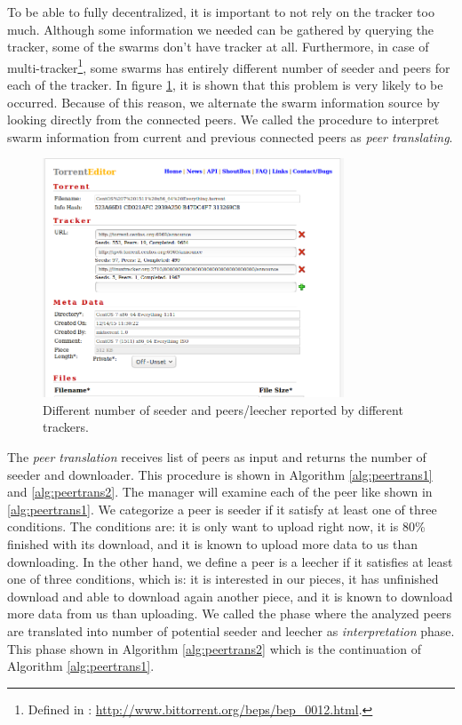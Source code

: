 To be able to fully decentralized, it is important to not rely on the tracker too much. Although some information we needed can be gathered by querying the tracker, some of the swarms don't have tracker at all. Furthermore, in case of multi-tracker\footnote{Defined in : \url{http://www.bittorrent.org/beps/bep_0012.html}.}, some swarms has entirely different number of seeder and peers for each of the tracker. In figure \ref{fig:diffsr}, it is shown that this problem is very likely to be occurred. Because of this reason, we alternate the swarm information source by looking directly from the connected peers. We called the procedure to interpret swarm information from current and previous connected peers as \textit{peer translating}. 

\begin{figure}[ht]
	\centering
	\includegraphics[width=0.8\textwidth]{pics/diffsr.png}
	\caption{Different number of seeder and peers/leecher reported by different trackers.}
	\label{fig:diffsr}
\end{figure}

The \textit{peer translation} receives list of peers as input and returns the number of seeder and downloader. This procedure is shown in Algorithm \ref{alg:peertrans1} and \ref{alg:peertrans2}. The manager will examine each of the peer like shown in \ref{alg:peertrans1}. We categorize a peer is seeder if it satisfy at least one of three conditions. The conditions are: it is only want to upload right now, it is 80\% finished with its download, and it is known to upload more data to us than downloading. In the other hand, we define a peer is a leecher if it satisfies at least one of three conditions, which is: it is interested in our pieces, it has unfinished download and able to download again another piece, and it is known to download more data from us than uploading. We called the phase where the analyzed peers are translated into number of potential seeder and leecher as \textit{interpretation} phase. This phase shown in Algorithm \ref{alg:peertrans2} which is the continuation of Algorithm \ref{alg:peertrans1}.

